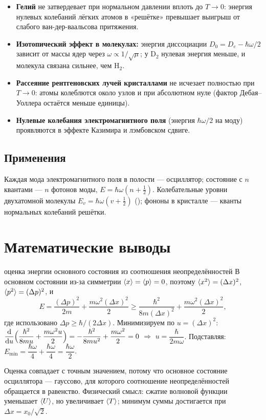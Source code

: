 \begin{itemize}
 \item \textbf{Гелий} не затвердевает при нормальном давлении вплоть до $T\to0$: энергия нулевых
       колебаний лёгких атомов в «решётке» превышает выигрыш от слабого ван-дер-ваальсова притяжения.
 \item \textbf{Изотопический эффект в молекулах:} энергия диссоциации $D_0=D_e-\hbar\omega/2$ зависит
       от массы ядер через $\omega\propto1/\sqrt\mu$; у D$_2$ нулевая энергия меньше, и молекула связана
       сильнее, чем H$_2$.
 \item \textbf{Рассеяние рентгеновских лучей кристаллами} не исчезает полностью при $T\to0$: атомы
       колеблются около узлов и при абсолютном нуле (фактор Дебая--Уоллера остаётся меньше единицы).
 \item \textbf{Нулевые колебания электромагнитного поля} (энергия $\hbar\omega/2$ на моду) проявляются
       в эффекте Казимира и лэмбовском сдвиге.
\end{itemize}

\subsection{Применения}

Каждая мода электромагнитного поля в полости — осциллятор; состояние с $n$ квантами — $n$ фотонов
моды, $E=\hbar\omega(n+\frac12)$. Колебательные уровни двухатомной молекулы $E_v=\hbar\omega(v+\frac12)$
(); фононы в кристалле — кванты нормальных колебаний решётки.

\section{Математические выводы}

\begin{derivation}[label=der:8:uncert]{оценка энергии основного состояния из соотношения неопределённостей}
В основном состоянии из-за симметрии $\langle x\rangle=\langle p\rangle=0$, поэтому $\langle x^2\rangle=(\Delta x)^2$,
$\langle p^2\rangle=(\Delta p)^2$, и
\[
  E=\frac{(\Delta p)^2}{2m}+\frac{m\omega^2(\Delta x)^2}{2}\ge\frac{\hbar^2}{8m(\Delta x)^2}+\frac{m\omega^2(\Delta x)^2}{2},
\]
где использовано $\Delta p\ge\hbar/(2\Delta x)$. Минимизируем по $u=(\Delta x)^2$:
$\dfrac{\mathrm{d}}{\mathrm{d} u}\Bigl(\dfrac{\hbar^2}{8mu}+\dfrac{m\omega^2u}{2}\Bigr)=-\dfrac{\hbar^2}{8mu^2}+\dfrac{m\omega^2}{2}=0$
$\Rightarrow$ $u=\dfrac{\hbar}{2m\omega}$. Подставляя: $E_{\min}=\dfrac{\hbar\omega}{4}+\dfrac{\hbar\omega}{4}=\dfrac{\hbar\omega}{2}$.

Оценка совпадает с точным значением, потому что основное состояние осциллятора — гауссово,
для которого соотношение неопределённостей обращается в равенство. Физический смысл: сжатие волновой
функции уменьшает $\langle U\rangle$, но увеличивает $\langle T\rangle$; минимум суммы достигается при $\Delta x=x_0/\sqrt2$.
\end{derivation}

